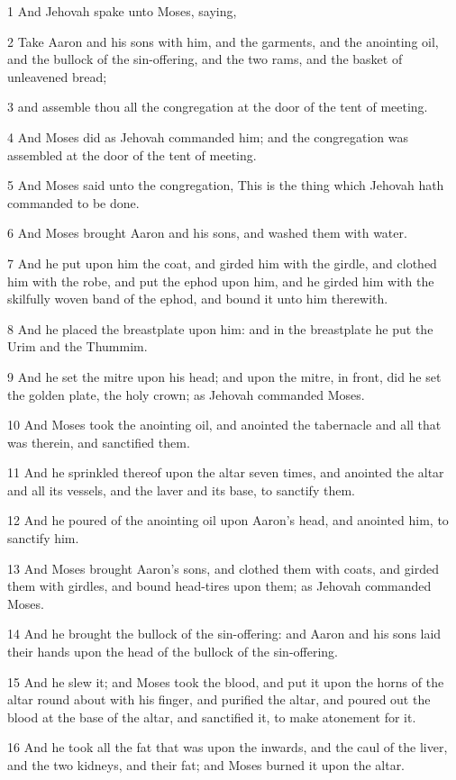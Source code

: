 \par 1 And Jehovah spake unto Moses, saying,
\par 2 Take Aaron and his sons with him, and the garments, and the anointing oil, and the bullock of the sin-offering, and the two rams, and the basket of unleavened bread;
\par 3 and assemble thou all the congregation at the door of the tent of meeting.
\par 4 And Moses did as Jehovah commanded him; and the congregation was assembled at the door of the tent of meeting.
\par 5 And Moses said unto the congregation, This is the thing which Jehovah hath commanded to be done.
\par 6 And Moses brought Aaron and his sons, and washed them with water.
\par 7 And he put upon him the coat, and girded him with the girdle, and clothed him with the robe, and put the ephod upon him, and he girded him with the skilfully woven band of the ephod, and bound it unto him therewith.
\par 8 And he placed the breastplate upon him: and in the breastplate he put the Urim and the Thummim.
\par 9 And he set the mitre upon his head; and upon the mitre, in front, did he set the golden plate, the holy crown; as Jehovah commanded Moses.
\par 10 And Moses took the anointing oil, and anointed the tabernacle and all that was therein, and sanctified them.
\par 11 And he sprinkled thereof upon the altar seven times, and anointed the altar and all its vessels, and the laver and its base, to sanctify them.
\par 12 And he poured of the anointing oil upon Aaron's head, and anointed him, to sanctify him.
\par 13 And Moses brought Aaron's sons, and clothed them with coats, and girded them with girdles, and bound head-tires upon them; as Jehovah commanded Moses.
\par 14 And he brought the bullock of the sin-offering: and Aaron and his sons laid their hands upon the head of the bullock of the sin-offering.
\par 15 And he slew it; and Moses took the blood, and put it upon the horns of the altar round about with his finger, and purified the altar, and poured out the blood at the base of the altar, and sanctified it, to make atonement for it.
\par 16 And he took all the fat that was upon the inwards, and the caul of the liver, and the two kidneys, and their fat; and Moses burned it upon the altar.
